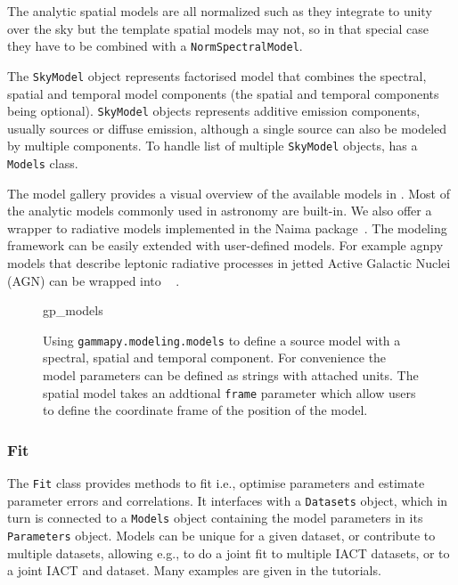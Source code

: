 \documentclass[traditabstract, longauth]{aa}
\newcommand{\code}[1]{\texttt{#1}}
\begin{document}
The analytic spatial models are all normalized such as they integrate to
unity over the sky but the template spatial models may not, so in that special
case they have to be combined with a \code{NormSpectralModel}.

The \code{SkyModel} object represents factorised model that combines the spectral,
spatial and temporal model components (the spatial and temporal components being
optional). \code{SkyModel} objects represents additive emission components, usually
sources or diffuse emission, although a single source can also be modeled by
multiple components. To handle list of multiple \code{SkyModel} objects, \gammapy
has a \code{Models} class.

The model gallery provides a visual overview of the available models in
\gammapy. Most of the analytic models  commonly used in \gammaray astronomy are
built-in. We also offer a wrapper to radiative models implemented in the Naima
package~\citep{naima}. The modeling framework can be easily extended with
user-defined models. For example agnpy models that describe leptonic radiative
processes in jetted Active Galactic Nuclei (AGN) can be wrapped into
\gammapy~\citep[see Section 3.5 of ][]{2021arXiv211214573N} .

\begin{figure}
	{gp_models}
	\caption{Using \code{gammapy.modeling.models} to define a source model with a
    spectral, spatial and temporal component. For convenience the model
    parameters can be defined as strings with attached units. The spatial model
    takes an addtional \code{frame} parameter which allow users to define
    the coordinate frame of the position of the model.
    }
	\label{fig*:minted:gp_models}
\end{figure}

\subsubsection{Fit}
\label{sssec:fit}

The \code{Fit} class provides methods to fit i.e., optimise parameters and estimate
parameter errors and correlations. It interfaces with a \code{Datasets} object, which
in turn is connected to a \code{Models} object containing the model parameters in its
\code{Parameters} object. Models can be unique for a given dataset, or contribute to
multiple datasets, allowing e.g., to do a joint fit to
multiple IACT datasets, or to a joint IACT and \fermi dataset. Many
examples are given in the tutorials.
\end{document}
